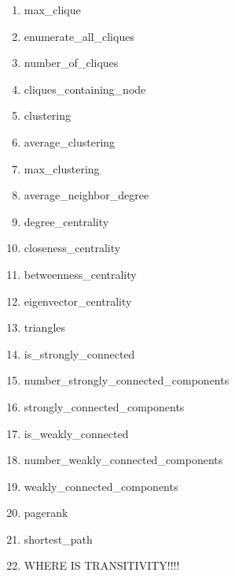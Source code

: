 \begin{enumerate}
    \item max\_clique
    \item enumerate\_all\_cliques
    \item number\_of\_cliques
    \item cliques\_containing\_node

    \item clustering
    \item average\_clustering
    \item max\_clustering

    \item average\_neighbor\_degree

    \item degree\_centrality
    \item closeness\_centrality
    \item betweenness\_centrality
    \item eigenvector\_centrality

    \item triangles

    \item is\_strongly\_connected
    \item number\_strongly\_connected\_components
    \item strongly\_connected\_components

    \item is\_weakly\_connected
    \item number\_weakly\_connected\_components
    \item weakly\_connected\_components

    \item pagerank

    \item shortest\_path

    \item WHERE IS TRANSITIVITY!!!!
\end{enumerate}
